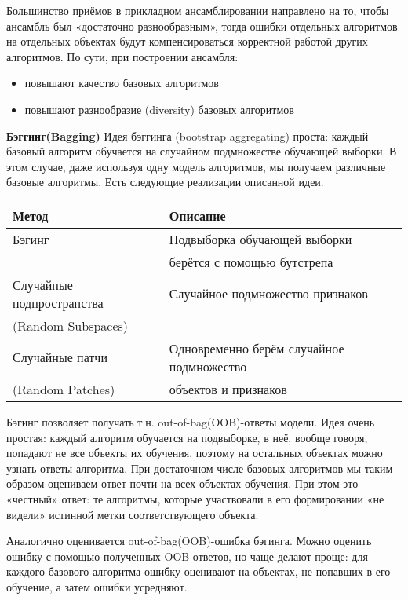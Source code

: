 Большинство приёмов в прикладном ансамблировании направлено на то, чтобы ансамбль был «достаточно разнообразным», тогда ошибки отдельных алгоритмов на отдельных объектах будут компенсироваться корректной работой других алгоритмов. По сути, при построении ансамбля:
\begin{itemize}
    \item повышают качество базовых алгоритмов
    \item повышают разнообразие (diversity) базовых алгоритмов
\end{itemize}

\textbf{Бэггинг(Bagging)}
Идея бэггинга (bootstrap aggregating) проста: каждый базовый алгоритм обучается на случайном подмножестве обучающей выборки. В этом случае, даже используя одну модель алгоритмов, мы получаем различные базовые алгоритмы. Есть следующие реализации описанной идеи. \\
\begin{center}
\begin{tabular}{l|l} 
    \hline\hline
    Метод  & Описание \\
     \hline\hline
    Бэгинг  & Подвыборка обучающей выборки \\
     & берётся с помощью бутстрепа \\
     \hline
    Случайные подпространства & Случайное подмножество признаков \\
    (Random Subspaces) & \\
    \hline
    Случайные патчи & Одновременно берём случайное подмножество \\
    (Random Patches) & объектов и признаков

 \end{tabular}
\end{center}

Бэгинг позволяет получать т.н. out-of-bag(OOB)-ответы модели. Идея очень простая: каждый алгоритм обучается на подвыборке, в неё, вообще говоря, попадают не все объекты их обучения, поэтому на остальных объектах можно узнать ответы алгоритма. При достаточном числе базовых алгоритмов мы таким образом оцениваем ответ почти на всех объектах обучения. При этом это «честный» ответ: те алгоритмы, которые участвовали в его формировании «не видели» истинной метки соответствующего объекта.

Аналогично оценивается out-of-bag(OOB)-ошибка бэгинга. Можно оценить ошибку с помощью полученных  OOB-ответов, но чаще делают проще: для каждого базового алгоритма ошибку оценивают на объектах, не попавших в его обучение, а затем ошибки усредняют.

